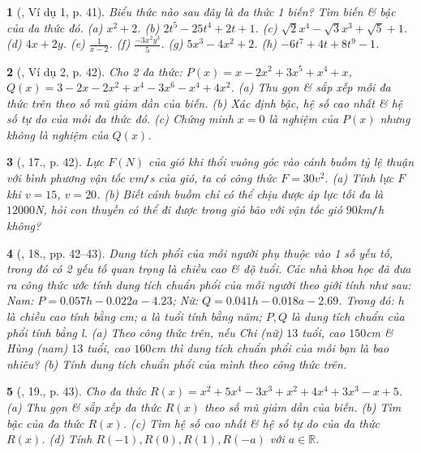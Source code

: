 \documentclass{article}
\newtheorem{baitoan}{}
\begin{document}
\begin{baitoan}[\cite{SBT_Toan_7_Canh_Dieu_tap_2}, Ví dụ 1, p. 41]
	Biểu thức nào sau đây là đa thức 1 biến? Tìm biến \& bậc của đa thức đó. (a) $x^2 + 2$. (b) $2t^5 - 25t^4 + 2t + 1$. (c) $\sqrt{2}x^4 - \sqrt{3}x^3 + \sqrt{5} + 1$. (d) $4x + 2y$. (e) $\frac{1}{x - 2}$. (f) $\frac{-3x^2y^3}{5}$. (g) $5x^3 - 4x^2 + 2$. (h) $-6t^7 + 4t + 8t^9 - 1$.
\end{baitoan}

\begin{baitoan}[\cite{SBT_Toan_7_Canh_Dieu_tap_2}, Ví dụ 2, p. 42]
	Cho 2 đa thức: $P(x) = x - 2x^2 + 3x^5 + x^4 + x$, $Q(x) = 3 - 2x - 2x^2 + x^4 - 3x^6 - x^4 + 4x^2$. (a) Thu gọn \& sắp xếp mỗi đa thức trên theo số mũ giảm dần của biến. (b) Xác định bậc, hệ số cao nhất \& hệ số tự do của mỗi đa thức đó. (c) Chứng minh $x = 0$ là nghiệm của $P(x)$ nhưng không là nghiệm của $Q(x)$.
\end{baitoan}

\begin{baitoan}[\cite{SBT_Toan_7_Canh_Dieu_tap_2}, 17., p. 42]
	Lực $F(N)$ của gió khi thổi vuông góc vào cánh buồm tỷ lệ thuận với bình phương vận tốc $v$\emph{m\texttt{/}s} của gió, ta có công thức $F = 30v^2$. (a) Tính lực $F$ khi $v = 15$, $v = 20$. (b) Biết cánh buồm chỉ có thể chịu được áp lực tối đa là $12000$\emph{N}, hỏi con thuyền có thể đi được trong gió bão với vận tốc gió $90$\emph{km\texttt{/}h} không?
\end{baitoan}

\begin{baitoan}[\cite{SBT_Toan_7_Canh_Dieu_tap_2}, 18., pp. 42--43]
	Dung tích phổi của mỗi người phụ thuộc vào 1 số yếu tố, trong đó có 2 yếu tố quan trọng là chiều cao \& độ tuổi. Các nhà khoa học đã đưa ra công thức ước tính dung tích chuẩn phổi của mỗi người theo giới tính như sau: Nam: $P = 0.057h - 0.022a - 4.23$; Nữ: $Q = 0.041h - 0.018a - 2.69$. Trong đó: $h$ là chiều cao tính bằng \emph{cm}; $a$ là tuổi tính bằng năm; $P,Q$ là dung tích chuẩn của phổi tính bằng \emph{l}. (a) Theo công thức trên, nếu Chi (nữ) $13$ tuổi, cao $150$\emph{cm} \& Hùng (nam) $13$ tuổi, cao $160$\emph{cm} thì dung tích chuẩn phổi của mỗi bạn là bao nhiêu? (b) Tính dung tích chuẩn phổi của mình theo công thức trên.
\end{baitoan}

\begin{baitoan}[\cite{SBT_Toan_7_Canh_Dieu_tap_2}, 19., p. 43]
	Cho đa thức $R(x) = x^2 + 5x^4 - 3x^3 + x^2 + 4x^4 + 3x^3 - x + 5$. (a) Thu gọn \& sắp xếp đa thức $R(x)$ theo số mũ giảm dần của biến. (b) Tìm bậc của đa thức $R(x)$. (c) Tìm hệ số cao nhất \& hệ số tự do của đa thức $R(x)$. (d) Tính $R(-1),R(0),R(1),R(-a)$ với $a\in\mathbb{R}$.
\end{baitoan}
\end{document}
